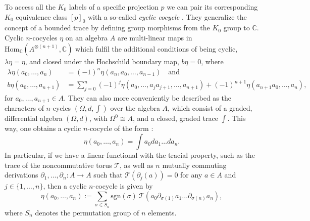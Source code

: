 \documentclass[submission, Phys]{SciPost}
\begin{document}
To access all the $K_0$ labels of a specific projection $p$ we can pair its corresponding $K_0$ equivalence class $[p]_0$ with a so-called \emph{cyclic cocycle} \cite{Connes1994,Gracia2000,Khalkhali2013}. 
They generalize the concept of a bounded trace by defining group morphisms from the $K_0$ group to $\mathbb{C}$.
Cyclic $n$-cocycles $\eta$ on an algebra $A$ are multi-linear maps in $\mathrm{Hom}_{\mathbb{C}}(A^{\otimes(n+1)},\mathbb{C})$ which fulfil the additional conditions of being cyclic, $\lambda \eta = \eta$, and closed under the Hochschild boundary map, $b\eta=0$, where
\begin{align}
    \lambda \eta(a_0,\dots,a_n)&=(-1)^n \eta(a_n,a_0,\dots,a_{n-1})\quad \mathrm{and} \\
    b \eta(a_0,\dots,a_{n+1}) &= \sum_{j=0}^n (-1)^j \eta(a_0,\dots,a_ja_{j+1},\dots,a_{n+1}) + (-1)^{n+1}\eta(a_{n+1}a_0,\dots,a_n),
\end{align}
for $a_0,\dots,a_{n+1}\in A$.
They can also more conveniently be described as the characters of $n$-cycles $(\Omega,d,\int)$ over the algebra $A$, which consist of a graded, differential algebra $(\Omega,d)$, with $\Omega^0\cong A$, and a closed, graded trace $\int$. 
This way, one obtains a cyclic $n$-cocycle of the form \cite[III.1.$\alpha$. Prop. 4]{Connes1994}:
\begin{equation}
    \eta(a_0,\dots,a_n) = \int a_0 da_1\dots da_n.
\end{equation}
In particular, if we have a linear functional with the tracial property, such as the trace of the noncommutative torus $\mathcal{T}$, as well as $n$ mutually commuting derivations $\partial_1,\dots,\partial_n: A\rightarrow A$ such that $\mathcal{T}(\partial_j(a))=0$ for any $a\in A$ and $j\in\{1,\dots,n\}$, then a cyclic $n$-cocycle is given by \cite[Example~3.6.6]{Khalkhali2013}
\begin{equation}
    \eta(a_0,\dots,a_n) := \sum_{\sigma\in S_n} \mathrm{sgn}(\sigma)\ \mathcal{T}(a_0 \partial_{\sigma(1)}a_1\dots \partial_{\sigma(n)}a_n),
\end{equation}
where $S_n$ denotes the permutation group of $n$ elements.
\end{document}
